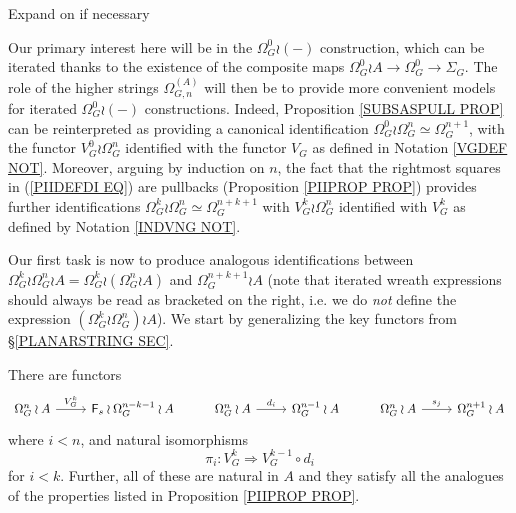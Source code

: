 \documentclass[a4paper,10pt]{article}%
\begin{document}
{\color{red} Expand on if necessary}

Our primary interest here will be in the 
$\Omega_{G}^{0}\wr (\minus)$ construction,
which can be iterated thanks to the existence of the composite maps
$\Omega_{G}^{0} \wr A \to \Omega_{G}^{0} \to \Sigma_G$.
The role of the higher strings $\Omega_{G,n}^{(A)}$ will then be to provide more convenient models for iterated 
$\Omega_{G}^{0}\wr (\minus)$ constructions.
Indeed, Proposition \ref{SUBSASPULL PROP} can be reinterpreted as providing a canonical identification
$\Omega_{G}^{0} \wr \Omega_{G}^{n} \simeq \Omega_{G}^{n+1}$,
with the functor $V_G^0 \wr \Omega_G^n$ identified with the functor $V_G$ as defined in Notation \ref{VGDEF NOT}.
Moreover, arguing by induction on $n$, the fact that the rightmost squares in (\ref{PIIDEFDI EQ}) are pullbacks
(Proposition \ref{PIIPROP PROP})
provides further identifications
$\Omega_{G}^{k} \wr \Omega_{G}^{n} \simeq \Omega_{G}^{n+k+1}$
with $V_G^k \wr \Omega_G^n$ identified with $V_G^k$ as defined by Notation \ref{INDVNG NOT}.

Our first task is now to produce analogous identifications between
$\Omega_{G}^{k} \wr \Omega_{G}^{n} \wr A =
\Omega_{G}^{k} \wr (\Omega_{G}^{n} \wr A)$
and 
$\Omega_{G}^{n+k+1} \wr A$
(note that iterated wreath expressions should always be read as bracketed on the right, i.e. we do \textit{not} define the expression
$ (\Omega_{G}^{k} \wr \Omega_{G}^{n}) \wr A$).
We start by generalizing the key functors from \S \ref{PLANARSTRING SEC}.

\begin{proposition}\label{PIIPROPA PROP}
There are functors
\[
	\begin{tikzcd}
	\Omega_G^n \wr A \ar{r}{V_G^k} & \Fin_s \wr \Omega_G^{n-k-1}\wr A
&
	\Omega_G^n \wr A \ar{r}{d_i} & \Omega_G^{n-1}\wr A
&
	\Omega_G^n \wr A \ar{r}{s_j} & \Omega_G^{n+1}\wr A
	\end{tikzcd}
\]
where $i<n$, and natural isomorphisms 
\[
	\pi_i \colon V_G^k \Rightarrow V_G^{k-1} \circ d_i
\]
for $i < k$.
Further, all of these are natural in $A$
and they satisfy all the analogues of the properties listed in 
Proposition \ref{PIIPROP PROP}.
\end{proposition}
\end{document}
